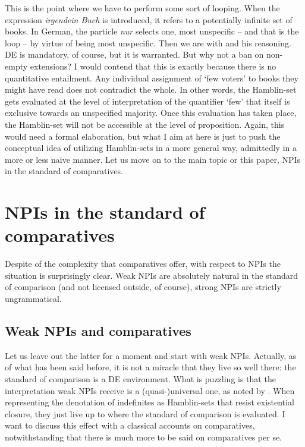 \documentclass[output=paper,colorlinks,citecolor=brown,
]{langscibook}
\begin{document}
This is the point where we have to perform some sort of looping. When the expression \textit{irgendein Buch} is
introduced, it refers to a potentially infinite set of books. In German, the particle \textit{nur} selects one, most
unspecific -- and that is the loop -- by virtue of being most unspecific. Then we are with \citet{krifka1995} and his
reasoning. DE is mandatory, of course, but it is warranted. But why not a ban on non-empty extensions? I would contend
that this is exactly because there is no quantitative entailment. Any individual assignment of `few voters' to books they
might have read does not contradict the whole. In other words, the Hamblin-set gets evaluated at the level of
interpretation of the quantifier `few' that itself is exclusive towards an unspecified majority. Once this evaluation
has taken place, the Hamblin-set will not be accessible at the level of proposition. Again, this would need a formal elaboration, but
what I aim at here is just to push the conceptual idea of utilizing Hamblin-sets in a more general way, admittedly in a more
or less naive manner. Let us move on to the main topic or this paper, NPIs in the standard of comparatives.

\section{NPIs in the standard of comparatives}

Despite of the complexity that comparatives offer, with respect to NPIs the situation is surprisingly clear. Weak NPIs
are absolutely natural in the standard of comparison (and not licensed outside, of course), strong NPIs are strictly
ungrammatical.

\subsection{Weak NPIs and comparatives}

Let us leave out the latter for a moment and start with weak NPIs. Actually, as of what has been said before, it is not
a miracle that they live so well there: the standard of comparison is a DE environment. What is puzzling is that the
interpretation weak NPIs receive is a (quasi-)universal one, as noted by \citet{schwarzschwilk2002}. When representing
the denotation of indefinites as Hamblin-sets that resist existential closure, they just live up to where the standard
of comparison is evaluated. I want to discuss
this effect with a classical accounts on comparatives, notwithstanding that there is much more to be said on
comparatives per se.
\end{document}
